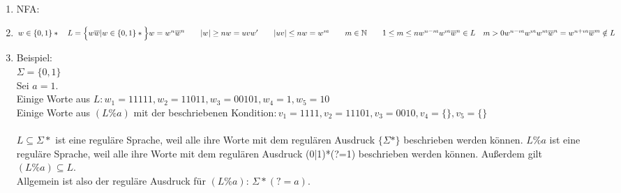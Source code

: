 \documentclass[a4paper]{scrartcl}
\title{\titleinfo}
\author{Arne Feil}
\date{\today}
\newcommand{\aufgabe}[1]{\item[\textbf{#1}]}
\begin{document}
\begin{enumerate}
\aufgabe{2.3}
NFA:\\
\aufgabe{2.4}
$w \in \{0,1\}* \quad L=\Big\{w\overline{w} | w \in \{0,1\}* \Big\} \\
w = w^n \overline{w}^n \quad \quad |w| \geq n \\
w = uvw' \quad \quad |uv| \leq n \\
w = w^m \quad \quad m \in \mathbb{N} \quad \quad 1 \leq m \leq n \\
w^{n-m}w^m\overline{w}^n \in L \quad m>0 \\
w^{n-m} w^m w^m \overline{w}^n = w^{n+m}\overline{w}^m \notin L$

\aufgabe{2.5}
Beispiel: \\
\(\Sigma = \{0, 1\}\) \\
Sei \(a = 1\). \\
Einige Worte aus \(L: w_1 = 11111, w_2 = 11011, w_3 = 00101, w_4 = 1, w_5 = 10\) \\
Einige Worte aus \((L\%a)\) mit der beschriebenen Kondition\(: v_1 = 1111, v_2 = 11101, v_3 = 0010, v_4 = \{\}, v_5 = \{\}\) \\
\\
\(L \subseteq \Sigma*\) ist eine reguläre Sprache, weil alle ihre Worte mit
dem regulären Ausdruck \(\{\Sigma*\}\) beschrieben werden können. \(L\%a\) ist
eine reguläre Sprache, weil alle ihre Worte mit dem regulären Ausdruck (0|1)*(?=1)
beschrieben werden können. Außerdem gilt \((L\%a) \subseteq L \).\\
Allgemein ist also der reguläre Ausdruck für \((L\%a)\): \(\Sigma*(?=a)\).
\end{enumerate}
\end{document}
